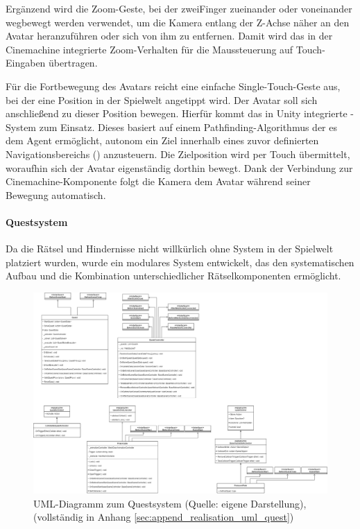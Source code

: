 Ergänzend wird die Zoom-Geste, bei der zweiFinger zueinander oder voneinander wegbewegt werden verwendet, um die Kamera entlang der Z-Achse näher an den Avatar heranzuführen oder sich von ihm zu entfernen. Damit wird das in der Cinemachine integrierte Zoom-Verhalten für die Maussteuerung auf Touch-Eingaben übertragen.

Für die Fortbewegung des Avatars reicht eine einfache Single-Touch-Geste aus, bei der eine Position in der Spielwelt angetippt wird. Der Avatar soll sich anschließend zu dieser Position bewegen. Hierfür kommt das in Unity integrierte -System zum Einsatz. Dieses basiert auf einem Pathfinding-Algorithmus der es dem Agent ermöglicht, autonom ein Ziel innerhalb eines zuvor definierten Navigationsbereichs () anzusteuern. Die Zielposition wird per Touch übermittelt, woraufhin sich der Avatar eigenständig dorthin bewegt. Dank der Verbindung zur Cinemachine-Komponente folgt die Kamera dem Avatar während seiner Bewegung automatisch.

\paragraph{Questsystem}\label{sec:quest-system}

Da die Rätsel und Hindernisse nicht willkürlich ohne System in der Spielwelt platziert wurden, wurde ein modulares System entwickelt, das den systematischen Aufbau und die Kombination unterschiedlicher Rätselkomponenten ermöglicht.

\begin{figure}[ht]
\centering
\includegraphics[width=1\linewidth]{content/pictures/QuestSystem.drawio.png}
\caption{UML-Diagramm zum Questsystem (Quelle: eigene Darstellung), (vollständig in Anhang \ref{sec:append_realisation_uml_quest})}
\label{fig:quest-system-uml}
\end{figure}

